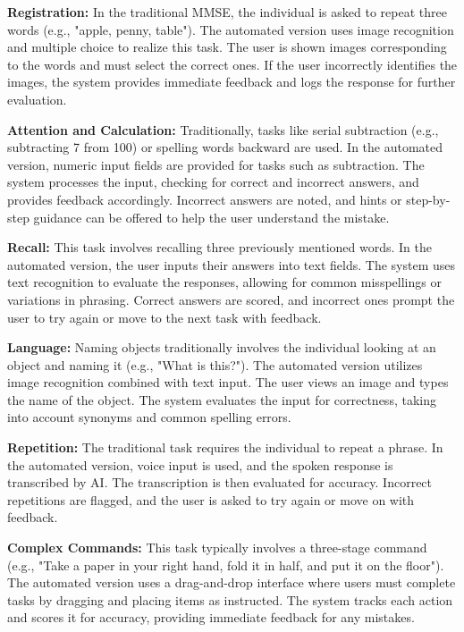 \textbf{Registration:} In the traditional MMSE, the individual is asked to repeat three words (e.g., "apple, penny, table"). The automated version uses image recognition and multiple choice to realize this task. The user is shown images corresponding to the words and must select the correct ones. If the user incorrectly identifies the images, the system provides immediate feedback and logs the response for further evaluation.

\textbf{Attention and Calculation:} Traditionally, tasks like serial subtraction (e.g., subtracting 7 from 100) or spelling words backward are used. In the automated version, numeric input fields are provided for tasks such as subtraction. The system processes the input, checking for correct and incorrect answers, and provides feedback accordingly. Incorrect answers are noted, and hints or step-by-step guidance can be offered to help the user understand the mistake.

\textbf{Recall:} This task involves recalling three previously mentioned words. In the automated version, the user inputs their answers into text fields. The system uses text recognition to evaluate the responses, allowing for common misspellings or variations in phrasing. Correct answers are scored, and incorrect ones prompt the user to try again or move to the next task with feedback.

\textbf{Language:} Naming objects traditionally involves the individual looking at an object and naming it (e.g., "What is this?"). The automated version utilizes image recognition combined with text input. The user views an image and types the name of the object. The system evaluates the input for correctness, taking into account synonyms and common spelling errors.

\textbf{Repetition:} The traditional task requires the individual to repeat a phrase. In the automated version, voice input is used, and the spoken response is transcribed by AI. The transcription is then evaluated for accuracy. Incorrect repetitions are flagged, and the user is asked to try again or move on with feedback.

\textbf{Complex Commands:} This task typically involves a three-stage command (e.g., "Take a paper in your right hand, fold it in half, and put it on the floor"). The automated version uses a drag-and-drop interface where users must complete tasks by dragging and placing items as instructed. The system tracks each action and scores it for accuracy, providing immediate feedback for any mistakes.

